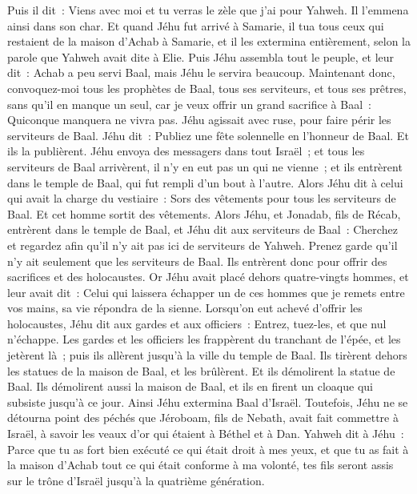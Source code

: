 \begin{multicols}{2}
Puis il dit~: Viens avec moi et tu verras le zèle que j'ai pour Yahweh. Il l'emmena ainsi dans son char.
Et quand Jéhu fut arrivé à Samarie, il tua tous ceux qui restaient de la maison d'Achab à Samarie, et il les extermina entièrement, selon la parole que Yahweh avait dite à Elie.
Puis Jéhu assembla tout le peuple, et leur dit~: Achab a peu servi Baal, mais Jéhu le servira beaucoup.
Maintenant donc, convoquez-moi tous les prophètes de Baal, tous ses serviteurs, et tous ses prêtres, sans qu'il en manque un seul, car je veux offrir un grand sacrifice à Baal~: Quiconque manquera ne vivra pas. Jéhu agissait avec ruse, pour faire périr les serviteurs de Baal.
Jéhu dit~: Publiez une fête solennelle en l'honneur de Baal. Et ils la publièrent.
Jéhu envoya des messagers dans tout Israël~; et tous les serviteurs de Baal arrivèrent, il n'y en eut pas un qui ne vienne~; et ils entrèrent dans le temple de Baal, qui fut rempli d'un bout à l'autre.
Alors Jéhu dit à celui qui avait la charge du vestiaire~: Sors des vêtements pour tous les serviteurs de Baal. Et cet homme sortit des vêtements.
Alors Jéhu, et Jonadab, fils de Récab, entrèrent dans le temple de Baal, et Jéhu dit aux serviteurs de Baal~: Cherchez et regardez afin qu'il n'y ait pas ici de serviteurs de Yahweh. Prenez garde qu'il n'y ait seulement que les serviteurs de Baal.
Ils entrèrent donc pour offrir des sacrifices et des holocaustes. Or Jéhu avait placé dehors quatre-vingts hommes, et leur avait dit~: Celui qui laissera échapper un de ces hommes que je remets entre vos mains, sa vie répondra de la sienne.
Lorsqu'on eut achevé d'offrir les holocaustes, Jéhu dit aux gardes et aux officiers~: Entrez, tuez-les, et que nul n'échappe. Les gardes et les officiers les frappèrent du tranchant de l'épée, et les jetèrent là~; puis ils allèrent jusqu'à la ville du temple de Baal.
Ils tirèrent dehors les statues de la maison de Baal, et les brûlèrent.
Et ils démolirent la statue de Baal. Ils démolirent aussi la maison de Baal, et ils en firent un cloaque qui subsiste jusqu'à ce jour.
Ainsi Jéhu extermina Baal d'Israël.
Toutefois, Jéhu ne se détourna point des péchés que Jéroboam, fils de Nebath, avait fait commettre à Israël, à savoir les veaux d'or qui étaient à Béthel et à Dan.
Yahweh dit à Jéhu~: Parce que tu as fort bien exécuté ce qui était droit à mes yeux, et que tu as fait à la maison d'Achab tout ce qui était conforme à ma volonté, tes fils seront assis sur le trône d'Israël jusqu'à la quatrième génération.

\end{multicols}

